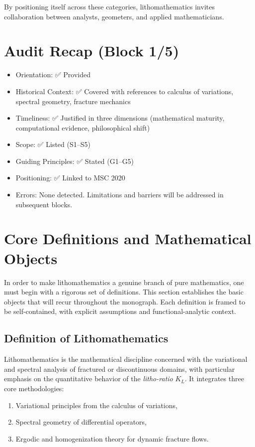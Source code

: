 By positioning itself across these categories, lithomathematics invites
collaboration between analysts, geometers, and applied mathematicians.

\bigskip

\section*{Audit Recap (Block 1/5)}
\begin{itemize}
  \item Orientation: ✅ Provided
  \item Historical Context: ✅ Covered with references to calculus of
  variations, spectral geometry, fracture mechanics
  \item Timeliness: ✅ Justified in three dimensions (mathematical maturity,
  computational evidence, philosophical shift)
  \item Scope: ✅ Listed (S1–S5)
  \item Guiding Principles: ✅ Stated (G1–G5)
  \item Positioning: ✅ Linked to MSC 2020
  \item Errors: None detected. Limitations and barriers will be addressed in
  subsequent blocks.
\end{itemize}

\bigskip

\section*{Core Definitions and Mathematical Objects}

In order to make lithomathematics a genuine branch of pure mathematics, one must
begin with a rigorous set of definitions. This section establishes the basic
objects that will recur throughout the monograph. Each definition is framed to
be self-contained, with explicit assumptions and functional-analytic context.

\subsection*{Definition of Lithomathematics}
\begin{definition}[Lithomathematics]
Lithomathematics is the mathematical discipline concerned with the variational
and spectral analysis of fractured or discontinuous domains, with particular
emphasis on the quantitative behavior of the \emph{litho-ratio} $K_L$. It
integrates three core methodologies:
\begin{enumerate}[label=(\roman*)]
  \item Variational principles from the calculus of variations,
  \item Spectral geometry of differential operators,
  \item Ergodic and homogenization theory for dynamic fracture flows.
\end{enumerate}
\end{definition}

